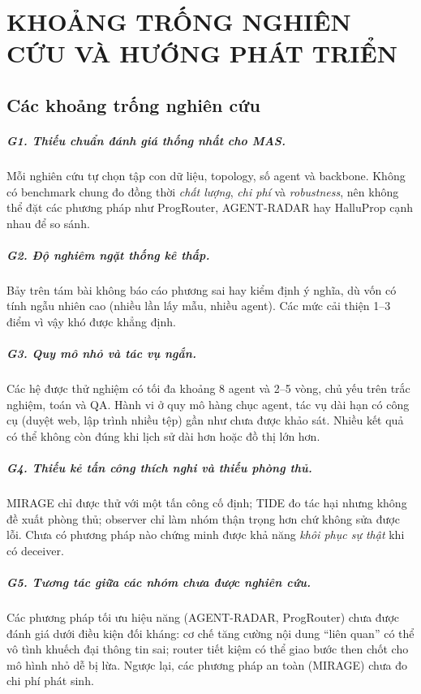 \chapter{KHOẢNG TRỐNG NGHIÊN CỨU VÀ HƯỚNG PHÁT TRIỂN}
\label{chap:gaps}

\section{Các khoảng trống nghiên cứu}

\paragraph{G1. Thiếu chuẩn đánh giá thống nhất cho MAS.} Mỗi nghiên cứu tự chọn tập con dữ liệu, topology, số agent và backbone. Không có benchmark chung đo đồng thời \emph{chất lượng}, \emph{chi phí} và \emph{robustness}, nên không thể đặt các phương pháp như ProgRouter, AGENT-RADAR hay HalluProp cạnh nhau để so sánh.

\paragraph{G2. Độ nghiêm ngặt thống kê thấp.} Bảy trên tám bài không báo cáo phương sai hay kiểm định ý nghĩa, dù \MAS{} vốn có tính ngẫu nhiên cao (nhiều lần lấy mẫu, nhiều agent). Các mức cải thiện 1--3 điểm vì vậy khó được khẳng định.

\paragraph{G3. Quy mô nhỏ và tác vụ ngắn.} Các hệ được thử nghiệm có tối đa khoảng 8 agent và 2--5 vòng, chủ yếu trên trắc nghiệm, toán và QA. Hành vi ở quy mô hàng chục agent, tác vụ dài hạn có công cụ (duyệt web, lập trình nhiều tệp) gần như chưa được khảo sát. Nhiều kết quả có thể không còn đúng khi lịch sử dài hơn hoặc đồ thị lớn hơn.

\paragraph{G4. Thiếu kẻ tấn công thích nghi và thiếu phòng thủ.} MIRAGE chỉ được thử với một tấn công cố định; TIDE đo tác hại nhưng không đề xuất phòng thủ; observer chỉ làm nhóm thận trọng hơn chứ không sửa được lỗi. Chưa có phương pháp nào chứng minh được khả năng \emph{khôi phục sự thật} khi có deceiver.

\paragraph{G5. Tương tác giữa các nhóm chưa được nghiên cứu.} Các phương pháp tối ưu hiệu năng (AGENT-RADAR, ProgRouter) chưa được đánh giá dưới điều kiện đối kháng: cơ chế tăng cường nội dung ``liên quan'' có thể vô tình khuếch đại thông tin sai; router tiết kiệm có thể giao bước then chốt cho mô hình nhỏ dễ bị lừa. Ngược lại, các phương pháp an toàn (MIRAGE) chưa đo chi phí phát sinh.

